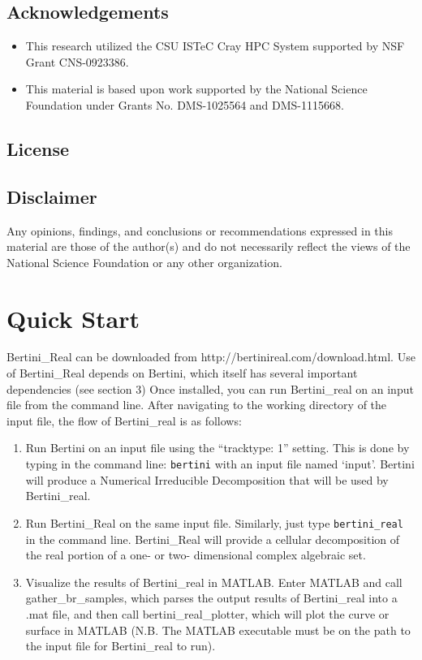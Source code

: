 \documentclass[10pt]{article}
\begin{document}
\subsection*{Acknowledgements}
\begin{itemize}
\item  This research utilized the CSU ISTeC Cray HPC System supported by NSF Grant CNS-0923386.
\item  This material is based upon work supported by the National Science Foundation under Grants No. DMS-1025564 and DMS-1115668.
\end{itemize}

\subsection{License}
\label{sec:license}

\subsection*{Disclaimer}

Any opinions, findings, and conclusions or recommendations expressed in this material are those of the author(s) and do not necessarily reflect the views of the National Science Foundation or any other organization.




\clearpage
\section{Quick Start}

Bertini\_Real can be downloaded from http://bertinireal.com/download.html. Use of Bertini\_Real depends on Bertini, which itself has several important dependencies (see section 3)
Once installed, you can run Bertini\_real on an input file from the command line. After navigating to the working directory of the input file, the flow of Bertini\_real is as follows:
\begin{enumerate}
\item Run Bertini on an input file using the ``tracktype: 1'' setting. This is done by typing in the command line: \texttt{bertini} with an input file named `input'. Bertini will produce a Numerical Irreducible Decomposition that will be used by Bertini\_real.
\item Run Bertini\_Real on the same input file. Similarly, just type \texttt{bertini\_real} in the command line. Bertini\_Real will provide a cellular decomposition of the real portion of a one- or two- dimensional complex algebraic set.
\item Visualize the results of Bertini\_real in MATLAB. Enter MATLAB and call gather\_br\_samples, which parses the output results of Bertini\_real into a .mat file, and then call bertini\_real\_plotter, which will plot the curve or surface in MATLAB (N.B. The MATLAB executable must be on the path to the input file for Bertini\_real to run).
\end{enumerate}
\label{sec:started}
\end{document}
